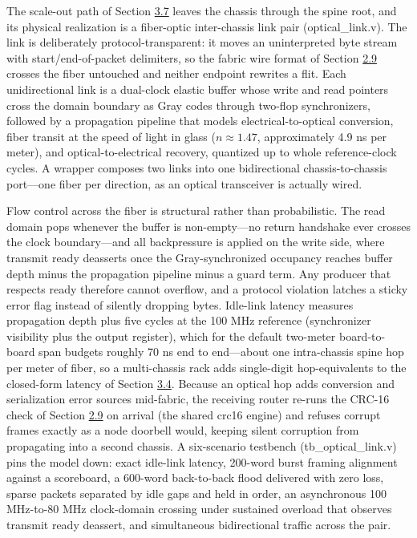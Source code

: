 \documentclass[12pt,onecolumn]{article}
\begin{document}
The scale-out path of Section \hyperref[sec:3.7]{3.7} leaves the chassis through the spine root, and its physical realization is a fiber-optic inter-chassis link pair (optical\_link.v). The link is deliberately protocol-transparent: it moves an uninterpreted byte stream with start/end-of-packet delimiters, so the fabric wire format of Section \hyperref[sec:2.9]{2.9} crosses the fiber untouched and neither endpoint rewrites a flit. Each unidirectional link is a dual-clock elastic buffer whose write and read pointers cross the domain boundary as Gray codes through two-flop synchronizers, followed by a propagation pipeline that models electrical-to-optical conversion, fiber transit at the speed of light in glass ($n \approx 1.47$, approximately 4.9 ns per meter), and optical-to-electrical recovery, quantized up to whole reference-clock cycles. A wrapper composes two links into one bidirectional chassis-to-chassis port---one fiber per direction, as an optical transceiver is actually wired.

Flow control across the fiber is structural rather than probabilistic. The read domain pops whenever the buffer is non-empty---no return handshake ever crosses the clock boundary---and all backpressure is applied on the write side, where transmit ready deasserts once the Gray-synchronized occupancy reaches buffer depth minus the propagation pipeline minus a guard term. Any producer that respects ready therefore cannot overflow, and a protocol violation latches a sticky error flag instead of silently dropping bytes. Idle-link latency measures propagation depth plus five cycles at the 100 MHz reference (synchronizer visibility plus the output register), which for the default two-meter board-to-board span budgets roughly 70 ns end to end---about one intra-chassis spine hop per meter of fiber, so a multi-chassis rack adds single-digit hop-equivalents to the closed-form latency of Section \hyperref[sec:3.4]{3.4}. Because an optical hop adds conversion and serialization error sources mid-fabric, the receiving router re-runs the CRC-16 check of Section \hyperref[sec:2.9]{2.9} on arrival (the shared crc16 engine) and refuses corrupt frames exactly as a node doorbell would, keeping silent corruption from propagating into a second chassis. A six-scenario testbench (tb\_optical\_link.v) pins the model down: exact idle-link latency, 200-word burst framing alignment against a scoreboard, a 600-word back-to-back flood delivered with zero loss, sparse packets separated by idle gaps and held in order, an asynchronous 100 MHz-to-80 MHz clock-domain crossing under sustained overload that observes transmit ready deassert, and simultaneous bidirectional traffic across the pair.
\end{document}

